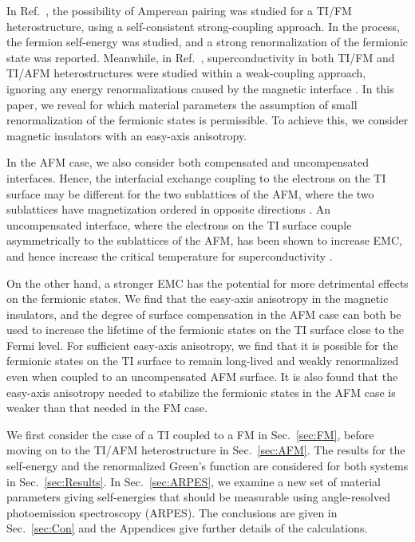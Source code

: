 \documentclass[aps, prb, twocolumn,amsmath,amssymb,floatfix]{revtex4-2}
\begin{document}
In Ref.~\cite{kargarianprl}, the possibility of Amperean pairing was studied for a TI/FM heterostructure, using a self-consistent strong-coupling approach. In the process, the fermion self-energy was studied, and a strong renormalization of the fermionic state was reported. Meanwhile, in Ref.~\cite{EirikTIFMAFM}, superconductivity in both TI/FM and TI/AFM heterostructures were studied within a weak-coupling approach, ignoring any energy renormalizations caused by the magnetic interface \cite{EirikTIFMAFM}. 
In this paper, we reveal for which material parameters the assumption of small renormalization of the fermionic states is permissible. To achieve this, we consider magnetic insulators with an easy-axis anisotropy. 

In the AFM case, we also consider both compensated and uncompensated interfaces. 
Hence, the interfacial exchange coupling to the electrons on the TI surface may be different for the two sublattices of the AFM, where the two sublattices have magnetization ordered in opposite directions \cite{EirikTIFMAFM, AkashOmega}.  
An uncompensated interface, where the electrons on the TI surface couple asymmetrically to the sublattices of the AFM, has been shown to increase EMC, and hence increase the critical temperature for superconductivity \cite{EirikTIFMAFM, EirikSqueezed, EirikSchwinger}. 

On the other hand, a stronger EMC has the potential for more detrimental effects on the fermionic states. We find that the easy-axis anisotropy in the magnetic insulators, and the degree of surface compensation in the AFM case can both be used to increase the lifetime of the fermionic states on the TI surface close to the Fermi level. For sufficient easy-axis anisotropy, we find that it is possible for the fermionic states on the TI surface to remain long-lived and weakly renormalized even when coupled to an uncompensated AFM surface. It is also found that the easy-axis anisotropy needed to stabilize the fermionic states in the AFM case is weaker than that needed in the FM case.

We first consider the case of a TI coupled to a FM in Sec.~\ref{sec:FM}, before moving on to the TI/AFM heterostructure in Sec.~\ref{sec:AFM}. The results for the self-energy and the renormalized Green's function are considered for both systems in Sec.~\ref{sec:Results}. In Sec.~\ref{sec:ARPES}, we examine a new set of material parameters giving self-energies that should be measurable using angle-resolved photoemission spectroscopy (ARPES). The conclusions are given in Sec.~\ref{sec:Con} and the Appendices give further details of the calculations.
\end{document}

